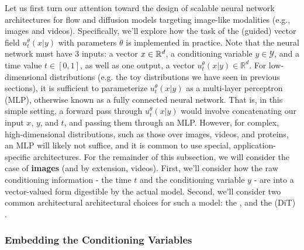 Let us first turn our attention toward the design of scalable neural network architectures for flow and diffusion models targeting image-like modalities (e.g., images and videos). Specifically, we'll explore how the task of the (guided) vector field $u_t^\theta(x|y)$ with parameters $\theta$ is implemented in practice. Note that the neural network must have 3 inputs: a vector $x\in\mathbb{R}^d$, a conditioning variable $y\in\mathcal{Y}$, and a time value $t\in [0,1]$, as well as one output, a vector $u_t^\theta(x|y)\in\mathbb{R}^d$. For low-dimensional distributions (e.g. the toy distributions we have seen in previous sections), it is sufficient to parameterize $u_t^\theta(x|y)$ as a multi-layer perceptron (MLP), otherwise known as a fully connected neural network. That is, in this simple setting, a forward pass through $u_t^\theta(x|y)$ would involve concatenating our input $x$, $y$, and $t$, and passing them through an MLP. However, for complex, high-dimensional distributions, such as those over images, videos, and proteins, an MLP will likely not suffice, and it is common to use special, application-specific architectures. For the remainder of this subsection, we will consider the case of \textbf{images} (and by extension, videos). First, we'll consider how the raw conditioning information - the time $t$ and the conditioning variable $y$ - are  into a vector-valued form digestible by the actual model. Second, we'll consider two common architectural architectural choices for such a model: the  \citep{ronneberger2015u, ho2020denoising, unet_cite_1, classifier_guidance}, and the  (DiT) \citep{dosovitskiy2020image, dit, ma2024sit}.

\subsubsection{Embedding the Conditioning Variables}
\label{subsubsec:encoding_the_conditioning_variables}


